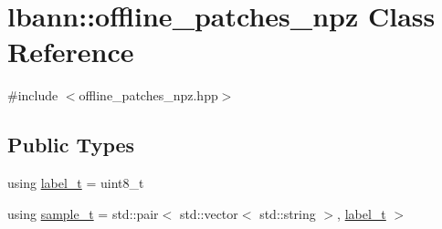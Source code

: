 \hypertarget{classlbann_1_1offline__patches__npz}{}\section{lbann\+:\+:offline\+\_\+patches\+\_\+npz Class Reference}
\label{classlbann_1_1offline__patches__npz}


{\ttfamily \#include $<$offline\+\_\+patches\+\_\+npz.\+hpp$>$}

\subsection*{Public Types}
\begin{DoxyCompactItemize}
\item 
using \hyperlink{classlbann_1_1offline__patches__npz_ae0ed6bf62b2be1814964206522ed4e05}{label\+\_\+t} = uint8\+\_\+t
\item 
using \hyperlink{classlbann_1_1offline__patches__npz_a61405205f907a697515786d0a9e7858a}{sample\+\_\+t} = std\+::pair$<$ std\+::vector$<$ std\+::string $>$, \hyperlink{classlbann_1_1offline__patches__npz_ae0ed6bf62b2be1814964206522ed4e05}{label\+\_\+t} $>$
\end{DoxyCompactItemize}
